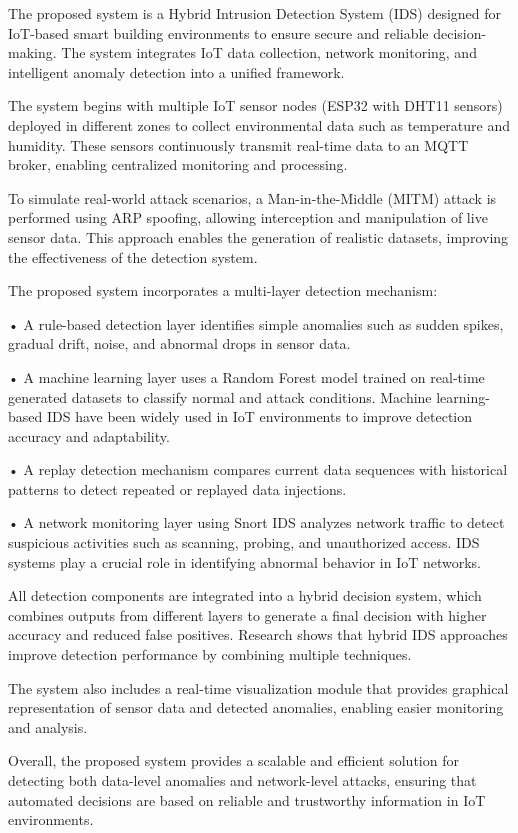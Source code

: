 The proposed system is a Hybrid Intrusion Detection System (IDS)
designed for IoT-based smart building environments to ensure secure and
reliable decision-making. The system integrates IoT data collection,
network monitoring, and intelligent anomaly detection into a unified
framework.

The system begins with multiple IoT sensor nodes (ESP32 with DHT11
sensors) deployed in different zones to collect environmental data such
as temperature and humidity. These sensors continuously transmit
real-time data to an MQTT broker, enabling centralized monitoring and
processing.

To simulate real-world attack scenarios, a Man-in-the-Middle (MITM)
attack is performed using ARP spoofing, allowing interception and
manipulation of live sensor data. This approach enables the generation
of realistic datasets, improving the effectiveness of the detection
system.

The proposed system incorporates a multi-layer detection mechanism:

• A rule-based detection layer identifies simple anomalies such as
sudden spikes, gradual drift, noise, and abnormal drops in sensor data.

• A machine learning layer uses a Random Forest model trained on
real-time generated datasets to classify normal and attack conditions.
Machine learning-based IDS have been widely used in IoT environments to
improve detection accuracy and adaptability.

• A replay detection mechanism compares current data sequences with
historical patterns to detect repeated or replayed data injections.

• A network monitoring layer using Snort IDS analyzes network traffic to
detect suspicious activities such as scanning, probing, and unauthorized
access. IDS systems play a crucial role in identifying abnormal behavior
in IoT networks.

All detection components are integrated into a hybrid decision system,
which combines outputs from different layers to generate a final
decision with higher accuracy and reduced false positives. Research
shows that hybrid IDS approaches improve detection performance by
combining multiple techniques.

The system also includes a real-time visualization module that provides
graphical representation of sensor data and detected anomalies, enabling
easier monitoring and analysis.

Overall, the proposed system provides a scalable and efficient solution
for detecting both data-level anomalies and network-level attacks,
ensuring that automated decisions are based on reliable and trustworthy
information in IoT environments.

